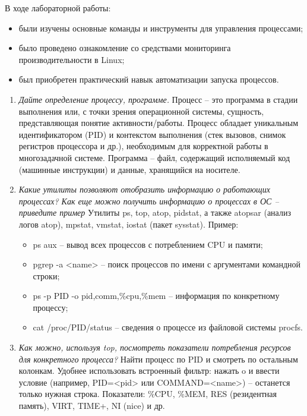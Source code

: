 
В ходе лабораторной работы: 
\begin{itemize}
	\item были изучены основные команды и инструменты для управления процессами;
	\item было проведено ознакомление со средствами мониторинга производительности в Linux;
	\item был приобретен практический навык автоматизации запуска процессов.
\end{itemize}


\begin{enumerate}
	\item \textit{Дайте определение процессу, программе. }\newline 
	Процесс -- это программа в стадии выполнения или, с точки зрения операционной системы, сущность, представляющая понятие активности/работы. Процесс обладает уникальным идентификатором (PID) и контекстом выполнения (стек вызовов, снимок регистров процессора и др.), необходимым для корректной работы в многозадачной системе.
	Программа -- файл, содержащий исполняемый код (машинные инструкции) и данные, хранящийся на носителе.
	\item \textit{Какие утилиты позволяют отобразить информацию о работающих процессах? Как еще можно получить информацию о процессах в ОС -- приведите пример }\newline 
	Утилиты ps, top, atop, pidstat, а также atopsar (анализ логов atop), mpstat, vmstat, iostat (пакет sysstat).
	Пример: 
	\begin{itemize}
		\item ps aux -- вывод всех процессов с потреблением CPU и памяти;
		\item pgrep -a <name> -- поиск процессов по имени с аргументами командной строки;
		\item ps -p PID -o pid,comm,\%cpu,\%mem -- информация по конкретному процессу;
		\item cat /proc/PID/status -- сведения о процессе из файловой системы procfs.
	\end{itemize}
	\item \textit{Как можно, используя top, посмотреть показатели потребления ресурсов для конкретного процесса?}\newline 
	Найти процесс по PID и смотреть по остальным колонкам. Удобнее использовать встроенный фильтр: нажать o и ввести условие (например, PID=<pid> или COMMAND=<name>) -- останется только нужная строка. Показатели: \%CPU, \%MEM, RES (резидентная память), VIRT, TIME+, NI (nice) и др.

\end{enumerate}
